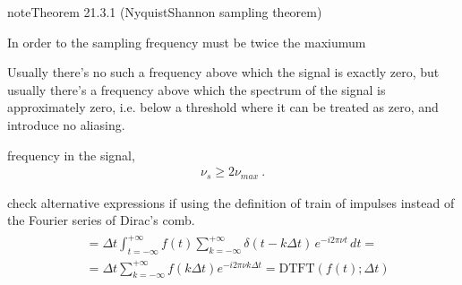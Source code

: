 \documentclass[letterpaper,10pt,english]{jupyterBook}
\begin{document}
\label{ch/complex/fourier-transforms:thm-shannon-nyquist}
\begin{sphinxadmonition}{note}{Theorem 21.3.1 (Nyquist\sphinxhyphen{}Shannon sampling theorem)}



\sphinxAtStartPar
In order to  the sampling frequency must be twice the maxiumum%
\begin{footnote}[1]\sphinxAtStartFootnote
Usually there’s no such a frequency above which the signal is exactly zero, but usually there’s a frequency above which the spectrum of the signal is approximately zero, i.e. below a threshold where it can be treated as zero, and introduce no aliasing.
%
\end{footnote} frequency in the signal,
\begin{equation*}
\begin{split}\nu_s \ge 2 \nu_{max} \ .\end{split}
\end{equation*}\end{sphinxadmonition}

\sphinxAtStartPar
{} check alternative expressions if using the definition of train of impulses instead of the Fourier series of Dirac’s comb.
\begin{equation}\label{equation:ch/complex/fourier-transforms:eq:dtft:2}
\begin{split}\begin{aligned}
 & = \Delta t \int_{t=-\infty}^{+\infty} f(t) \sum_{k=-\infty}^{+\infty} \delta(t - k \Delta t) \, e^{-i 2 \pi \nu t} \, dt = \\
 & = \Delta t \sum_{k=-\infty}^{+\infty} f(k \Delta t)  e^{-i 2 \pi \nu k \Delta t} = \text{DTFT}\left( f(t); \Delta t \right) 
\end{aligned}\end{split}
\end{equation}
\end{document}
